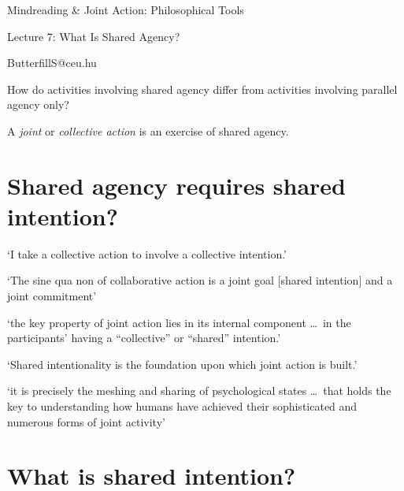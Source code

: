 \documentclass[11pt]{extarticle}
\date{}
\begin{document}
\begin{multicols}{3}

\setlength\footnotesep{1em}









\begin{center}
{\Large
Mindreading \& Joint Action: Philosophical Tools}

Lecture 7: What Is Shared Agency?


ButterfillS@ceu.hu
\end{center}


How do activities involving shared agency differ from activities involving parallel agency only?

A \emph{joint} or \emph{collective action} is an exercise of shared agency.

\section{Shared agency requires shared intention?}

`I take a collective action to involve a collective intention.'  \citep%
{Gilbert:2006wr}

`The sine qua non of collaborative action is a joint goal [shared intention] and a joint commitment’ 
\citep%
{tomasello:2008origins}

`the key property of joint action lies in its internal component \ldots \ in the participants’ having a ``collective'' or ``shared'' intention.' \citep%
{alonso_shared_2009}

`Shared intentionality is the foundation upon which joint action is built.' \citep%
{Carpenter:2009wq}

`it is precisely the meshing and sharing of psychological states \ldots \ that holds the key to understanding how humans have achieved their sophisticated and numerous forms of joint activity'
\citep%
{Call:2009fk}



\section{What is shared intention?}


\end{multicols}
\end{document}
